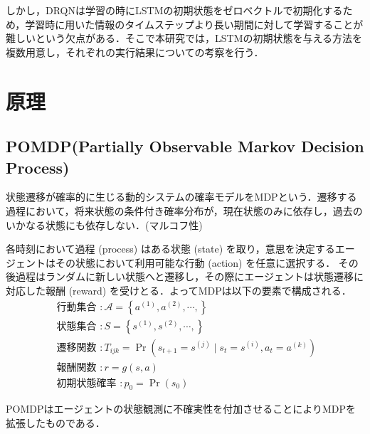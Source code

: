 \documentclass{eithesis}
\begin{document}
  しかし，DRQNは学習の時にLSTMの初期状態をゼロベクトルで初期化するため，学習時に用いた情報のタイムステップより長い期間に対して学習することが難しいという欠点がある．そこで本研究では，LSTMの初期状態を与える方法を複数用意し，それぞれの実行結果についての考察を行う．

\chapter{原理}
  \section{POMDP(Partially Observable Markov Decision Process)}
    状態遷移が確率的に生じる動的システムの確率モデルをMDPという．遷移する過程において，将来状態の条件付き確率分布が，現在状態のみに依存し，過去のいかなる状態にも依存しない．(マルコフ性)

    各時刻において過程 (process) はある状態 (state) を取り，意思を決定するエージェントはその状態において利用可能な行動 (action) を任意に選択する． その後過程はランダムに新しい状態へと遷移し，その際にエージェントは状態遷移に対応した報酬 (reward) を受けとる．よってMDPは以下の要素で構成される．
    \begin{equation}
    \begin{array}{l}\text { 行動集合 }: \mathcal{A}=\left\{a^{(1)}, a^{(2)}, \cdots,\right\} \\ \text { 状態集合 }: S=\left\{s^{(1)}, s^{(2)}, \cdots,\right\} \\ \text { 遷移関数 }: T_{i j k}=\operatorname{Pr}\left(s_{t+1}=s^{(j)} \mid s_{t}=s^{(i)}, a_{t}=a^{(k)}\right) \\ \text { 報酬関数 }: r = g(s, a) \\ \text { 初期状態確率 }: p_{0}=\operatorname{Pr}\left(s_{0}\right)\end{array}
    \end{equation}

    POMDPはエージェントの状態観測に不確実性を付加させることによりMDPを拡張したものである．
\end{document}
